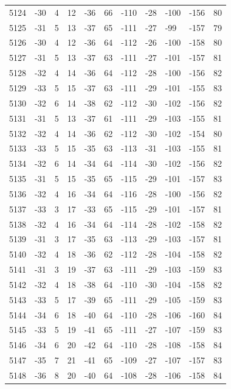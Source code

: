 \begin{table}[H]
\begin{tabular}{lllllllllll}
5124 & -30 & 4 & 12 & -36 & 66 & -110 & -28 & -100 & -156 & 80 \\
5125 & -31 & 5 & 13 & -37 & 65 & -111 & -27 & -99 & -157 & 79 \\
5126 & -30 & 4 & 12 & -36 & 64 & -112 & -26 & -100 & -158 & 80 \\
5127 & -31 & 5 & 13 & -37 & 63 & -111 & -27 & -101 & -157 & 81 \\
5128 & -32 & 4 & 14 & -36 & 64 & -112 & -28 & -100 & -156 & 82 \\
5129 & -33 & 5 & 15 & -37 & 63 & -111 & -29 & -101 & -155 & 83 \\
5130 & -32 & 6 & 14 & -38 & 62 & -112 & -30 & -102 & -156 & 82 \\
5131 & -31 & 5 & 13 & -37 & 61 & -111 & -29 & -103 & -155 & 81 \\
5132 & -32 & 4 & 14 & -36 & 62 & -112 & -30 & -102 & -154 & 80 \\
5133 & -33 & 5 & 15 & -35 & 63 & -113 & -31 & -103 & -155 & 81 \\
5134 & -32 & 6 & 14 & -34 & 64 & -114 & -30 & -102 & -156 & 82 \\
5135 & -31 & 5 & 15 & -35 & 65 & -115 & -29 & -101 & -157 & 83 \\
5136 & -32 & 4 & 16 & -34 & 64 & -116 & -28 & -100 & -156 & 82 \\
5137 & -33 & 3 & 17 & -33 & 65 & -115 & -29 & -101 & -157 & 81 \\
5138 & -32 & 4 & 16 & -34 & 64 & -114 & -28 & -102 & -158 & 82 \\
5139 & -31 & 3 & 17 & -35 & 63 & -113 & -29 & -103 & -157 & 81 \\
5140 & -32 & 4 & 18 & -36 & 62 & -112 & -28 & -104 & -158 & 82 \\
5141 & -31 & 3 & 19 & -37 & 63 & -111 & -29 & -103 & -159 & 83 \\
5142 & -32 & 4 & 18 & -38 & 64 & -110 & -30 & -104 & -158 & 82 \\
5143 & -33 & 5 & 17 & -39 & 65 & -111 & -29 & -105 & -159 & 83 \\
5144 & -34 & 6 & 18 & -40 & 64 & -110 & -28 & -106 & -160 & 84 \\
5145 & -33 & 5 & 19 & -41 & 65 & -111 & -27 & -107 & -159 & 83 \\
5146 & -34 & 6 & 20 & -42 & 64 & -110 & -28 & -108 & -158 & 84 \\
5147 & -35 & 7 & 21 & -41 & 65 & -109 & -27 & -107 & -157 & 83 \\
5148 & -36 & 8 & 20 & -40 & 64 & -108 & -28 & -106 & -158 & 84 \\

\end{tabular}
\end{table}
